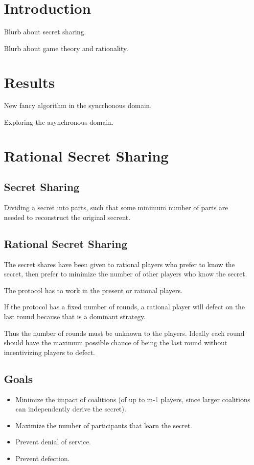 \documentclass{article}
\begin{document}
\section{Introduction}

Blurb about secret sharing.

Blurb about game theory and rationality.

\section{Results}

New fancy algorithm in the syncrhonous domain.

Exploring the asynchronous domain.

\section{Rational Secret Sharing}
\subsection{Secret Sharing}
Dividing a secret into parts, such that some minimum number of parts are needed to reconstruct the original secrent.

\subsection{Rational Secret Sharing}
The secret shares have been given to rational players who prefer to know the secret, then prefer to minimize the number of other players who know the secret.

The protocol has to work in the present or rational players.

If the protocol has a fixed number of rounds, a rational player will defect on the last round because that is a dominant strategy.
		
Thus the number of rounds must be unknown to the players. Ideally each round should have the maximum possible chance of being the last round without incentivizing players to defect.

\subsection{Goals}
\begin{itemize}
	\item Minimize the impact of coalitions (of up to m-1 players, since larger coalitions can independently derive the secret).
	\item Maximize the number of participants that learn the secret.
	\item Prevent denial of service.
	\item Prevent defection.
\end{itemize}
\end{document}
